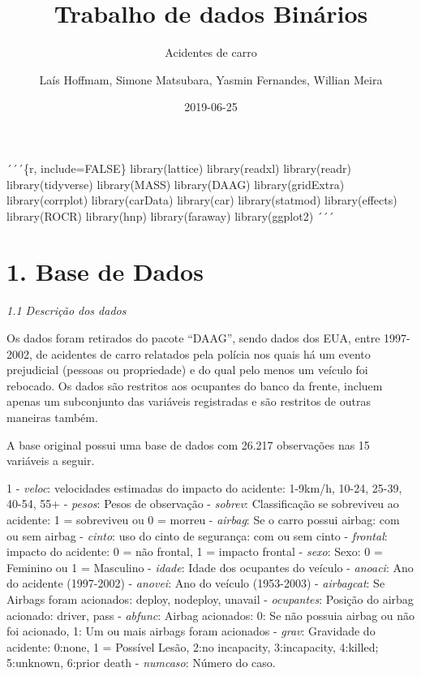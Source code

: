 \documentclass[]{article}
\title{Trabalho de dados Binários}
\subtitle{Acidentes de carro}
\author{Laís Hoffmam, Simone Matsubara, Yasmin Fernandes, Willian Meira}
\date{2019-06-25}
\begin{document}
\maketitle

´´´\{r, include=FALSE\} library(lattice) library(readxl) library(readr)
library(tidyverse) library(MASS) library(DAAG) library(gridExtra)
library(corrplot) library(carData) library(car) library(statmod)
library(effects) library(ROCR) library(hnp) library(faraway)
library(ggplot2) ´´´

\section{1. Base de Dados}\label{base-de-dados}

\emph{1.1 Descrição dos dados}

Os dados foram retirados do pacote ``DAAG'', sendo dados dos EUA, entre
1997-2002, de acidentes de carro relatados pela polícia nos quais há um
evento prejudicial (pessoas ou propriedade) e do qual pelo menos um
veículo foi rebocado. Os dados são restritos aos ocupantes do banco da
frente, incluem apenas um subconjunto das variáveis registradas e são
restritos de outras maneiras também.

A base original possui uma base de dados com 26.217 observações nas 15
variáveis a seguir.

1 - \emph{veloc}: velocidades estimadas do impacto do acidente: 1-9km/h,
10-24, 25-39, 40-54, 55+  - \emph{pesos}: Pesos de observação
 - \emph{sobrev}: Classificação se sobreviveu ao acidente: 1 =
sobreviveu ou 0 = morreu  - \emph{airbag}: Se o carro possui
airbag: com ou sem airbag  - \emph{cinto}: uso do cinto de
segurança: com ou sem cinto  - \emph{frontal}: impacto do
acidente: 0 = não frontal, 1 = impacto frontal  - \emph{sexo}:
Sexo: 0 = Feminino ou 1 = Masculino  - \emph{idade}: Idade dos
ocupantes do veículo  - \emph{anoaci}: Ano do acidente
(1997-2002)  - \emph{anovei}: Ano do veículo (1953-2003)
 - \emph{airbagcat}: Se Airbags foram acionados: deploy,
nodeploy, unavail  - \emph{ocupantes}: Posição do airbag
acionado: driver, pass  - \emph{abfunc}: Airbag acionados: 0:
Se não possuia airbag ou não foi acionado, 1: Um ou mais airbags foram
acionados  - \emph{grav}: Gravidade do acidente: 0:none, 1 =
Possível Lesão, 2:no incapacity, 3:incapacity, 4:killed; 5:unknown,
6:prior death  - \emph{numcaso}: Número do caso.
\end{document}
